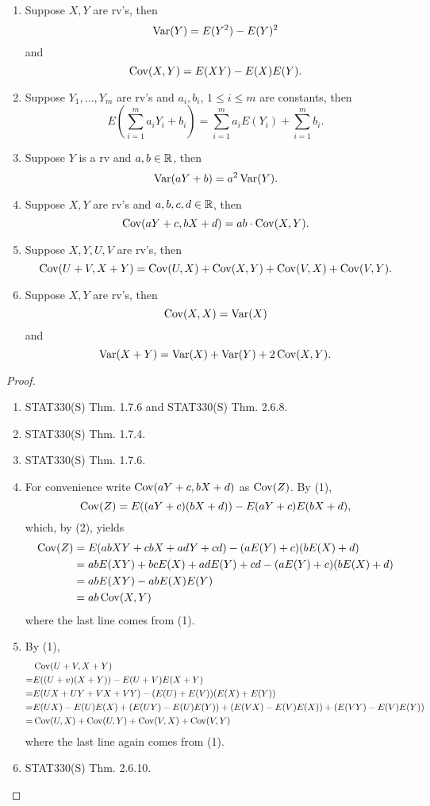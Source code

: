 \documentclass[11pt,fleqn]{book} %
\begin{document}
\begin{proposition} \label{prop:112}
\begin{enumerate}
\item Suppose \(X, Y\) are rv's, then
\[
\operatorname{Var}(Y) = E(Y^2) - E(Y)^2
\]
and
\[
\operatorname{Cov}(X, Y) = E(XY) - E(X)E(Y).
\]
\item Suppose \(Y_1, \ldots, Y_m\) are rv's and \(a_i, b_i\), \(1 \leq i \leq m\) are constants, then
\[
E\left(\sum_{i=1}^m a_iY_i + b_i\right) = \sum_{i=1}^ma_iE(Y_i) + \sum_{i=1}^m b_i.
\]
\item Suppose \(Y\) is a rv and \(a, b \in \mathbb{R}\), then
\[
\operatorname{Var}(aY + b) = a^2\operatorname{Var}(Y).
\]
\item Suppose \(X, Y\) are rv's and \(a, b, c, d \in \mathbb{R}\), then
\[
\operatorname{Cov}(aY + c, bX + d) = ab\cdot\operatorname{Cov}(X, Y).
\]
\item Suppose \(X, Y, U, V\) are rv's, then
\[
\operatorname{Cov}(U + V, X + Y) = \operatorname{Cov}(U, X) + \operatorname{Cov}(X, Y) + \operatorname{Cov}(V, X) + \operatorname{Cov}(V, Y).
\]
\item Suppose \(X, Y\) are rv's, then
\[
\operatorname{Cov}(X, X) = \operatorname{Var}(X)
\]
and
\[
\operatorname{Var}(X + Y) = \operatorname{Var}(X) + \operatorname{Var}(Y) + 2\operatorname{Cov}(X, Y).
\]
\end{enumerate}
\end{proposition}
\begin{proof}
\begin{enumerate}
\item STAT330(S) Thm. 1.7.6 and STAT330(S) Thm. 2.6.8.
\item STAT330(S) Thm. 1.7.4.
\item STAT330(S) Thm. 1.7.6.
\item For convenience write \(\operatorname{Cov}(aY + c, bX + d)\) as \(\operatorname{Cov}(Z)\). By (1),
\[
\operatorname{Cov}(Z) = E((aY + c)(bX + d)) - E(aY + c)E(bX + d),
\]
which, by (2), yields
\[
\begin{aligned}
\operatorname{Cov}(Z) &= E(abXY + cbX + adY + cd) - (aE(Y) + c)(bE(X) + d) \\
&= abE(XY) + bcE(X) + adE(Y) + cd - (aE(Y) + c)(bE(X) + d) \\
&= abE(XY) - abE(X)E(Y) \\
&= ab\operatorname{Cov}(X, Y)
\end{aligned}
\]
where the last line comes from (1).
\item By (1),
\[
\begin{aligned}
&\operatorname{Cov}(U + V, X + Y) \\
= &E((U + v)(X + Y)) - E(U + V)E(X + Y) \\
= &E(UX + UY + VX + VY) - (E(U) + E(V))(E(X) + E(Y)) \\
= &E(UX) - E(U)E(X) + (E(UY) - E(U)E(Y)) + (E(VX) - E(V)E(X)) + (E(VY) - E(V)E(Y)) \\
= &\operatorname{Cov}(U, X) + \operatorname{Cov}(U, Y) + \operatorname{Cov}(V, X) + \operatorname{Cov}(V, Y)
\end{aligned}
\]
where the last line again comes from (1).
\item STAT330(S) Thm. 2.6.10.
\end{enumerate}
\end{proof}
\end{document}
